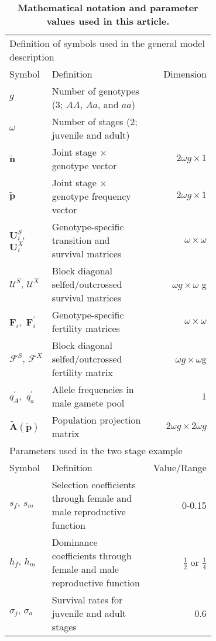 \documentclass[11pt]{article}
\def\mbf#1{\mathbf{#1}}
\def\mcal#1{\mathcal{#1}}
\begin{document}
\begin{table}[htbp]
\centering
\caption{\bf Mathematical notation and parameter values used in this article.}
\label{tab:Terms}
\begin{tabular}{ l p{0.7\linewidth} r }
 \toprule
\multicolumn{3}{l}{Definition of symbols used in the general model description} \\

Symbol & Definition & Dimension \\
\hline
$g$      & Number of genotypes ($3$; $AA$, $Aa$, and $aa$) & \\
$\omega$ & Number of stages ($2$; juvenile and adult) & \\
$\tilde{\mbf{n}}$ & Joint stage $\times$ genotype vector & $2 \omega g \times 1$ \\
$\tilde{\mbf{p}}$ & Joint stage $\times$ genotype frequency vector & $2 \omega g \times 1$ \\
$\mbf{U}^{S}_{i}$,\, $\mbf{U}^{X}_{i}$ & Genotype-specific transition and survival matrices & $\omega \times \omega$ \\
$\mcal{U}^{S},\, \mcal{U}^{X}$ & Block diagonal selfed/outcrossed survival matrices & $\omega g \times \omega$ g\\
$\mbf{F}_{i}$,\, $\mbf{F}^{\prime}_{i}$ & Genotype-specific fertility matrices & $\omega \times \omega$ \\
$\mcal{F}^{S},\, \mcal{F}^{X}$ & Block diagonal selfed/outcrossed fertility matrix & $\omega g \times \omega$g \\
$q^{\prime}_{A}$,\, $q^{\prime}_{a}$ & Allele frequencies in male gamete pool & $1$ \\
$\tilde{\mbf{A}}(\tilde{\mbf{p}})$ & Population projection matrix & $2 \omega g \times 2\omega g$ \\
\hline
\multicolumn{3}{l}{Parameters used in the two stage example} \\
Symbol & Definition & Value/Range\\
\hline
$s_f,\,s_m$ & Selection coefficients through female and male reproductive function & 0-0.15\\
$h_f,\,h_m$ & Dominance coefficients through female and male reproductive function & $\frac{1}{2}$ or $\frac{1}{4}$\\
$\sigma_j,\, \sigma_a$ & Survival rates for juvenile and adult stages & 0.6\\

\end{tabular}
\end{table}
\end{document}
